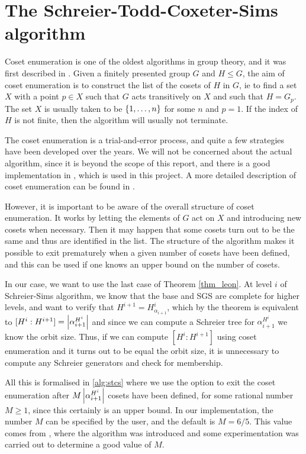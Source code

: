 \chapter{The Schreier-Todd-Coxeter-Sims algorithm}

Coset enumeration is one of the oldest algorithms in group theory, and
it was first described in \cite{tc36}. Given a finitely presented
group $G$ and $H \leq G$, the aim of coset enumeration is to construct
the list of the cosets of $H$ in $G$, ie to find a set $X$ with a
point $p \in X$ such that $G$ acts transitively on $X$ and such that
$H = G_p$. The set $X$ is usually taken to be $\left\lbrace 1, \dotsc, n \right\rbrace$ for
some $n$ and $p = 1$. If the index of $H$ is not finite, then the algorithm will usually not terminate.

The coset enumeration is a trial-and-error process, and quite a few
strategies have been developed over the years. We will not be
concerned about the actual algorithm, since it is beyond the scope of this report, and there is a good
implementation in \GAP, which is used in this project. A more detailed
description of coset enumeration can be found in \cite{sims98}.

However, it is important to be aware of the overall structure of coset
enumeration. It works by letting the elements of $G$ act on $X$ and
introducing new cosets when necessary. Then it may happen that some
cosets turn out to be the same and thus are identified in the list.
The structure of the algorithm makes it possible to exit prematurely
when a given number of cosets have been defined, and this can be used
if one knows an upper bound on the number of cosets.

In our case, we want to use the last case of Theorem \ref{thm_leon}.
At level $i$ of Schreier-Sims algorithm, we know that the base and SGS
are complete for higher levels, and want to verify that $H^{i + 1} =
H^i_{\alpha_{i + 1}}$, which by the theorem is equivalent to $[H^i :
H^{i + 1}] = \left\lvert \alpha_{i + 1}^{H^i} \right\rvert$ and since we can compute a
Schreier tree for $\alpha_{i + 1}^{H^i}$ we know the orbit size. Thus,
if we can compute $[H^i : H^{i + 1}]$ using coset enumeration and it turns out to be equal the
orbit size, it is unnecessary to compute any Schreier generators and
check for membership.

All this is formalised in \ref{alg:stcs} where we use the option to
exit the coset enumeration after $M \left\lvert \alpha_{i + 1}^{H^i} \right\rvert$ cosets have
been defined, for some rational number $M \geq 1$, since this
certainly is an upper bound. In our implementation, the number $M$ can
be specified by the user, and the default is $M = 6/5$. This
value comes from \cite{leon80}, where the algorithm was introduced and
some experimentation was carried out to determine a good value of $M$.

